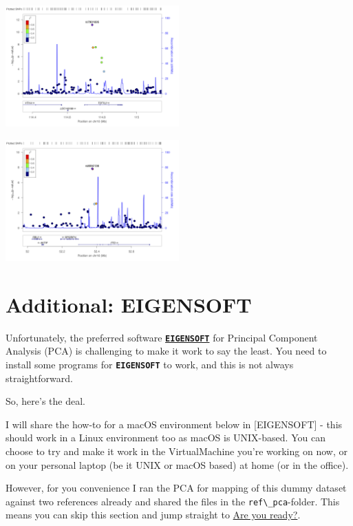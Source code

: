 \documentclass[
]{book}
\newcommand{\passthrough}[1]{#1}
\begin{document}
\includegraphics[width=0.5\textwidth,height=\textheight]{./img/_gwas/CEU.rs7901695.400kb.png}

\includegraphics[width=0.5\textwidth,height=\textheight]{./img/_gwas/CEU.rs8050136.400kb.png}

\hypertarget{eigensoft}{%
\chapter{Additional: EIGENSOFT}\label{eigensoft}}

Unfortunately, the preferred software \textbf{\href{https://github.com/DReichLab/EIG}{\passthrough{\lstinline!EIGENSOFT!}}} for Principal Component Analysis (PCA) is challenging to make it work to say the least. You need to install some programs for \textbf{\passthrough{\lstinline!EIGENSOFT!}} to work, and this is not always straightforward.

So, here's the deal.

I will share the how-to for a macOS environment below in {[}EIGENSOFT{]} - this should work in a Linux environment too as macOS is UNIX-based. You can choose to try and make it work in the VirtualMachine you're working on now, or on your personal laptop (be it UNIX or macOS based) at home (or in the office).

However, for you convenience I ran the PCA for mapping of this dummy dataset against two references already and shared the files in the \passthrough{\lstinline!ref\_pca!}-folder. This means you can skip this section and jump straight to \protect\hyperlink{are-you-ready}{Are you ready?}.
\end{document}
